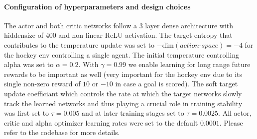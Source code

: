 \paragraph{Configuration of hyperparameters and design choices}
The actor and both critic networks follow a 3 layer dense architecture with hiddensize of 400 and non linear ReLU activation. The target entropy that contributes to the temperature update was set to $-\text{dim}(\textit{action-space}) = -4$ for the hockey env controlling a single agent. The initial temperature controlling alpha was set to $\alpha = 0.2$. With $\gamma = 0.99$ we enable learning for long range future rewards to be important as well (very important for the hockey env due to its single non-zero reward of $10$ or $-10$ in case a goal is scored). The soft target update coefficiant which controls the rate at which the target networks slowly track the learned networks and thus playing a crucial role in training stability was first set to $\tau = 0.005$ and at later training stages set to $\tau = 0.0025$. All actor, critic and alpha optimizer learning rates were set to the default $0.0001$. Please refer to the codebase for more details.

